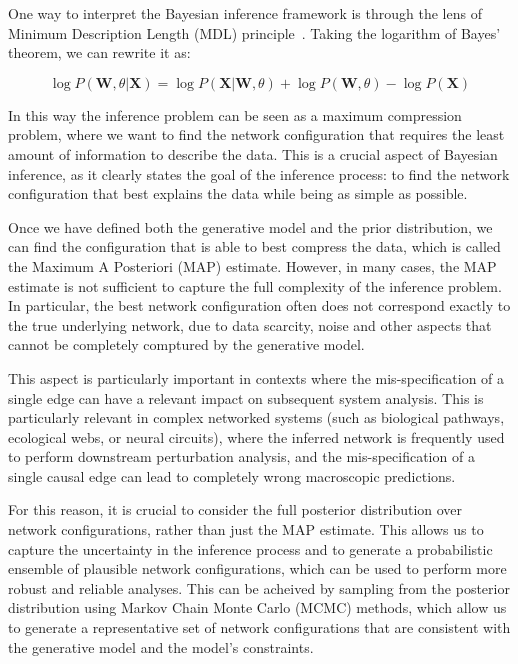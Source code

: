 \documentclass[10pt, aps, rmp,  twocolumn, superscriptaddress, floatfix, showkeys]{revtex4-2}
\begin{document}

One way to interpret the Bayesian inference framework is through the lens of Minimum Description Length (MDL) principle~\cite{rissanen1978modeling}. Taking the logarithm of Bayes' theorem, we can rewrite it as:

\begin{equation}
    \log P(\mathbf{W},\theta|\mathbf{X}) = \log P(\mathbf{X}|\mathbf{W}, \theta) + \log P(\mathbf{W}, \theta) - \log P(\mathbf{X})
\end{equation}

In this way the inference problem can be seen as a maximum compression problem, where we want to find the network configuration that requires the least amount of information to describe the data. This is a crucial aspect of Bayesian inference, as it clearly states the goal of the inference process: to find the network configuration that best explains the data while being as simple as possible.


Once we have defined both the generative model and the prior distribution, we can find the configuration that is able to best compress the data, which is called the Maximum A Posteriori (MAP) estimate. However, in many cases, the MAP estimate is not sufficient to capture the full complexity of the inference problem. In particular, the best network configuration often does not correspond exactly to the true underlying network, due to data scarcity, noise and other aspects that cannot be completely comptured by the generative model. 

This aspect is particularly important in contexts where the mis-specification of a single edge can have a relevant impact on subsequent system analysis. This is particularly relevant in complex networked systems (such as biological pathways, ecological webs, or neural circuits), where the inferred network is frequently used to perform downstream perturbation analysis, and the mis-specification of a single causal edge can lead to completely wrong macroscopic predictions. 

For this reason, it is crucial to consider the full posterior distribution over network configurations, rather than just the MAP estimate. This allows us to capture the uncertainty in the inference process and to generate a probabilistic ensemble of plausible network configurations, which can be used to perform more robust and reliable analyses. This can be acheived by sampling from the posterior distribution using Markov Chain Monte Carlo (MCMC) methods, which allow us to generate a representative set of network configurations that are consistent with the generative model and the model's constraints.
\end{document}
